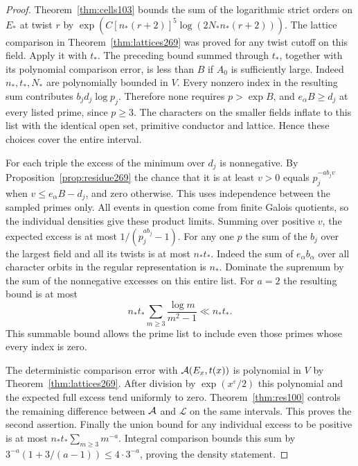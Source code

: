 \documentclass[a4paper,11pt]{article}
\theoremstyle{definition}
\theoremstyle{remark}
\numberwithin{equation}{section}
\begin{document}
\begin{proof}
Theorem~\ref{thm:cells103} bounds the sum of the logarithmic
strict orders on \(E_*\) at twist \(r\) by
\(\exp(C[n_*(r+2)]^5\log(2N_*n_*(r+2)))\).
The lattice comparison in Theorem~\ref{thm:lattices269}
was proved for any twist cutoff on this field. Apply it with
\(t_*\). The preceding bound summed through \(t_*\), together
with its polynomial comparison error, is less than \(B\)
if \(A_0\) is sufficiently large. Indeed \(n_*,t_*,N_*\)
are polynomially bounded in \(V\). Every nonzero index in
the resulting sum contributes \(b_jd_j\log p_j\). Therefore
none requires \(p>\exp B\), and \(e_\alpha B\ge d_j\) at
every listed prime, since \(p\ge3\). The characters on the
smaller fields inflate to this list with the identical open
set, primitive conductor and lattice. Hence these choices
cover the entire interval.

For each triple the excess of the minimum over \(d_j\) is
nonnegative. By Proposition~\ref{prop:residue269} the chance
that it is at least \(v>0\) equals \(p_j^{-a b_j v}\)
when \(v\le e_\alpha B-d_j\), and zero otherwise. This uses
independence between the sampled primes only. All events
in question come from finite Galois quotients, so the
individual densities give these product limits. Summing over
positive \(v\), the expected excess is at most
\(1/(p_j^{a b_j}-1)\). For any one \(p\) the sum of the
\(b_j\) over the largest field and all its twists is at
most \(n_*t_*\). Indeed the sum of \(e_\alpha b_\alpha\)
over all character orbits in the regular representation is
\(n_*\). Dominate the supremum by the sum of the nonnegative
excesses on this entire list. For \(a=2\) the resulting bound
is at most
\[
                 n_*t_*\sum_{m\ge3}\frac{\log m}{m^2-1}
                 \ll n_*t_* .
\]
This summable bound allows the prime list to include even
those primes whose every index is zero.

The deterministic comparison error with \({\cal A}(E_x,t(x))\)
is polynomial in \(V\) by Theorem~\ref{thm:lattices269}.
After division by \(\exp(x^\varepsilon/2)\) this polynomial
and the expected full excess tend uniformly to zero.
Theorem~\ref{thm:res100} controls the remaining difference
between \({\cal A}\) and \(\mathcal L\) on the same intervals.
This proves the second assertion. Finally the union bound
for any individual excess to be positive is at most
\(n_*t_*\sum_{m\ge3}m^{-a}\). Integral comparison bounds this
sum by \(3^{-a}(1+3/(a-1))\le4\cdot3^{-a}\), proving the
density statement.
\end{proof}
\end{document}
